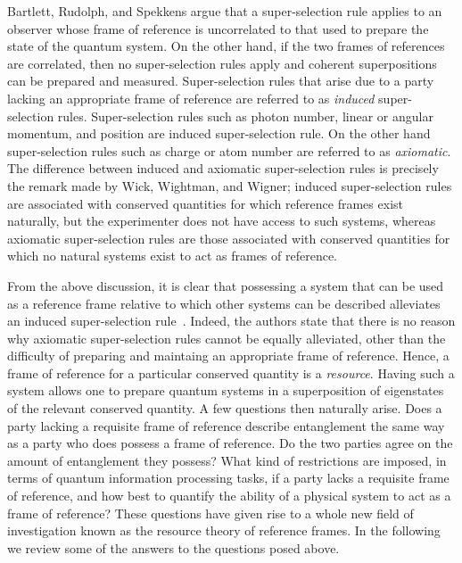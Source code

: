 \documentclass{article}
\newcommand\defn[1]{\textsl{#1}}
\begin{document}
Bartlett, Rudolph, and Spekkens argue that a super-selection rule applies to an observer whose frame of reference is uncorrelated to that used to prepare the state of the quantum system.  On the other hand, if the two frames of references are correlated, then no super-selection rules apply and coherent superpositions can be prepared and measured.  Super-selection rules that arise due to a party lacking an appropriate frame of reference are referred to as \defn{induced} super-selection rules.  Super-selection rules such as photon number, linear or angular momentum, and position are induced super-selection rule.  On the other hand super-selection rules such as charge or atom number are referred to as \defn{axiomatic}.  The difference between induced and axiomatic super-selection rules is precisely the remark made by Wick, Wightman, and Wigner; induced super-selection rules are associated with conserved quantities for which reference frames exist naturally, but the experimenter does not have access to such systems, whereas axiomatic super-selection rules are those associated with conserved quantities for which no natural systems exist to act as frames of reference. 

From the above discussion, it is clear that  possessing a system that can be used as a reference frame relative to which other systems can be described alleviates an induced super-selection rule~\cite{BRS07}. Indeed, the authors state that there is no reason why axiomatic super-selection rules cannot be equally alleviated, other than the difficulty of preparing and maintaing an appropriate frame of reference.  Hence, a frame of reference for a particular conserved quantity is a \defn{resource}.  Having such a system allows one to prepare quantum systems in a superposition of eigenstates of the relevant conserved quantity.  A few questions then naturally arise. Does a party lacking a requisite frame of reference describe entanglement the same way as a party who does possess a frame of reference.  Do the two parties agree on the amount of entanglement they possess? What kind of restrictions are imposed, in terms of quantum information processing tasks, if a party lacks a requisite frame of reference, and how best to quantify the ability of a physical system to act as a frame of reference? These questions have given rise to a whole new field of investigation known as the resource theory of reference frames.  In the following we review some of the answers to the questions posed above.   
\end{document}
